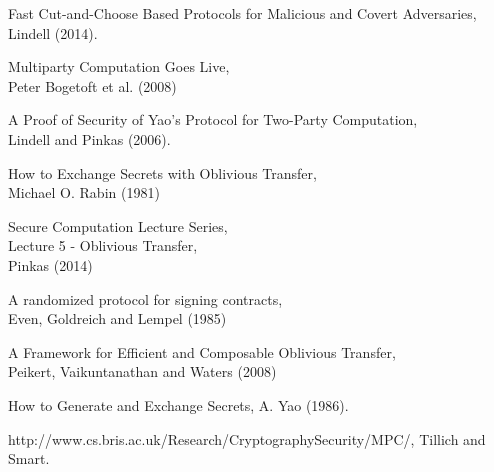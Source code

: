 \documentclass[a4paper,10pt]{article}
\begin{document}
	\begin{thebibliography}{5}
			Fast Cut-and-Choose Based Protocols for Malicious and Covert Adversaries,\\
			Lindell (2014).

			Multiparty Computation Goes Live,\\
			Peter Bogetoft et al. (2008)

			A Proof of Security of Yao’s Protocol for Two-Party Computation,\\
			Lindell and Pinkas (2006).
    
			How to Exchange Secrets with Oblivious Transfer,\\
			Michael O. Rabin (1981)

			Secure Computation Lecture Series,\\
			Lecture 5 - Oblivious Transfer,\\
			Pinkas (2014)

			A randomized protocol for signing contracts,\\
			Even, Goldreich and Lempel (1985)

 			A Framework for Efficient and Composable Oblivious Transfer,\\
			Peikert, Vaikuntanathan and Waters (2008)

			How to Generate and Exchange Secrets,
			A. Yao (1986).

			http://www.cs.bris.ac.uk/Research/CryptographySecurity/MPC/,
			Tillich and Smart. 

	\end{thebibliography}
\end{document}
